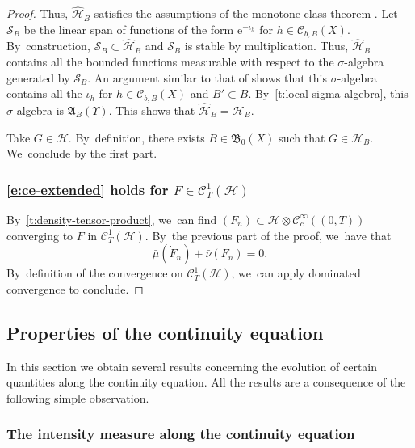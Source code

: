 \documentclass[10pt]{amsart}
\theoremstyle{definition}
\theoremstyle{remark}
\let\Subsubsection\subsubsection
\begin{document}
\begin{proof}
Thus, $\hat{\mathscr{H}}_{B}$ satisfies the assumptions of the monotone class theorem \cite[Th.\,21, p.\,20]{DellacherieMeyer}.
Let $\mathscr{S}_{B}$ be the linear span of functions of the form $\mathrm{e}^{-\iota_{h}}$ for $h \in \mathscr{C}_{b,B}(X)$.
By~construction, $\mathscr{S}_{B} \subset \hat{\mathscr{H}}_{B}$ and $\mathscr{S}_{B}$ is stable by multiplication.
Thus, $\hat{\mathscr{H}}_{B}$ contains all the bounded functions measurable with respect to the $\sigma$-algebra generated by $\mathscr{S}_{B}$.
An argument similar to that of \cite[Lem.\,2]{LastAnaSto} shows that this $\sigma$-algebra contains all the $\iota_{h}$ for $h \in \mathscr{C}_{b,B}(X)$ and $B' \subset B$.
By~\cref{t:local-sigma-algebra}, this $\sigma$-algebra is $\mathfrak{A}_{B}(\varUpsilon)$.
This shows that $\hat{\mathscr{H}}_{B} = \mathscr{H}_{B}$.

Take $G \in \mathscr{H}$.
By~definition, there exists $B \in \mathfrak{B}_{0}(X)$ such that $G \in \mathscr{H}_{B}$. We~conclude by the first part.

\Subsubsection*{\cref{e:ce-extended} holds for $F \in \mathscr{C}_{T}^{1}(\mathscr{H})$}
By~\cref{t:density-tensor-product}, we~can find $(F_{n}) \subset \mathscr{H} \otimes \mathscr{C}_{c}^{\infty}((0,T))$ converging to $F$ in $\mathscr{C}_{T}^{1}(\mathscr{H})$.
By~the previous part of the proof, we~have that
\begin{equation*}
\bar{\mu}(\dot{F}_{n}) + \bar{\nu}(F_{n}) = 0.
\end{equation*}
By~definition of the convergence on $\mathscr{C}_{T}^{1}(\mathscr{H})$, we~can apply dominated convergence to conclude.
\end{proof}

\subsection{Properties of the continuity equation}
In this section we obtain several results concerning the evolution of certain quantities along the continuity equation.
All the results are a consequence of the following simple observation.

\Subsubsection{The intensity measure along the continuity equation}
\end{document}
